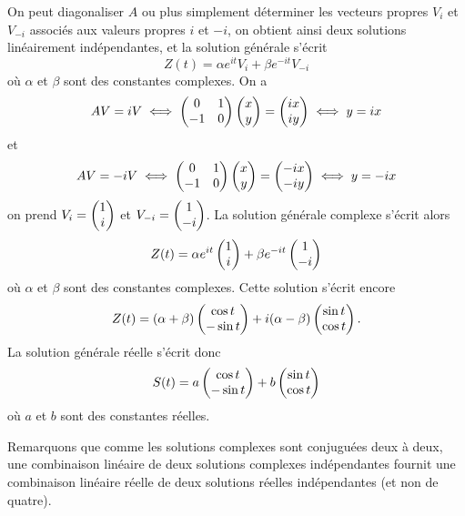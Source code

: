 \documentclass[class=report,crop=false]{standalone}
\begin{document}
\begin{exemple}
On peut diagonaliser $A$ ou plus simplement déterminer les vecteurs 
propres $V_i$ et $V_{-i}$ associés aux valeurs propres $i$ et $-i$, 
on obtient ainsi deux solutions linéairement indépendantes, et la solution générale s'écrit
$$Z(t)=\alpha e^{it}V_i+\beta e^{-it}V_{-i}$$
où $\alpha$ et $\beta$ sont des constantes complexes.
On a
$$AV=iV\iff \left(\begin{matrix}0&1\cr -1&0\end{matrix}\right)\left(\begin{matrix}x\cr y\end{matrix}\right)=\left(\begin{matrix}ix\cr iy\end{matrix}\right)
\iff y=ix $$ 
et
$$AV=-iV\iff \left(\begin{matrix}0&1\cr -1&0\end{matrix}\right)\left(\begin{matrix}x\cr y\end{matrix}\right)=\left(\begin{matrix}-ix\cr -iy\end{matrix}\right)
\iff y=-ix $$
on prend $V_i=\left(\begin{matrix}1\cr i\end{matrix}\right)$ et 
$V_{-i}=\left(\begin{matrix}1\cr -i\end{matrix}\right)$. 
La solution générale complexe s'écrit alors 
$$Z(t)=\alpha e^{it}\left(\begin{matrix}1\cr i\end{matrix}\right)+\beta e^{-it}\left(\begin{matrix}1\cr -i\end{matrix}\right)$$
où $\alpha$ et $\beta$ sont des constantes complexes. Cette solution s'écrit encore
$$Z(t)=(\alpha+\beta)\left(\begin{matrix}\cos t\cr -\sin t\end{matrix}\right)
+i(\alpha-\beta)\left(\begin{matrix}\sin t\cr \cos t\end{matrix}\right).$$ 
La solution générale réelle s'écrit donc 
$$S(t)=a\left(\begin{matrix}\cos t\cr -\sin t\end{matrix}\right)
+b\left(\begin{matrix}\sin t\cr \cos t\end{matrix}\right)$$
où $a$ et $b$ sont des constantes réelles.

Remarquons que comme les solutions complexes sont conjuguées deux à deux, 
une combinaison linéaire de deux solutions complexes indépendantes 
fournit une combinaison linéaire réelle de deux solutions réelles 
indépendantes (et non de quatre).


\end{exemple}
\end{document}
